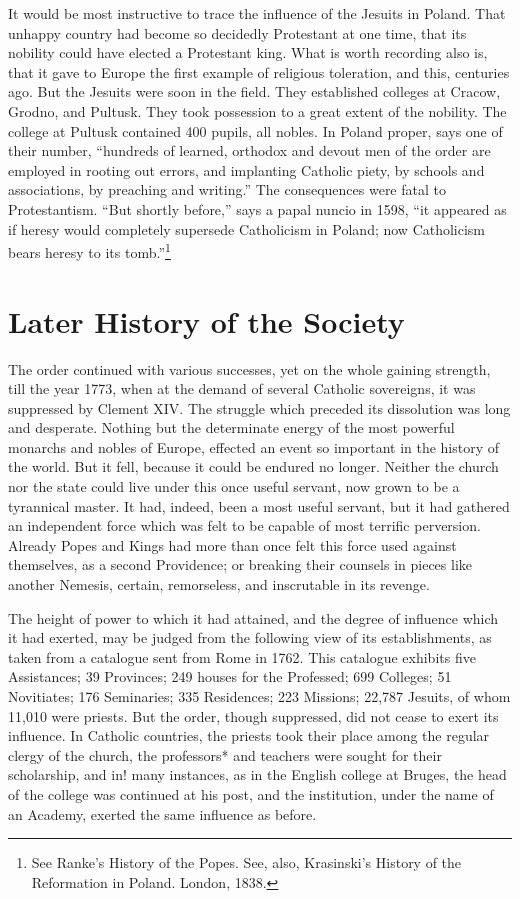 \documentclass[]{book}
\let\rmarkdownfootnote\footnote%
\def\footnote{\protect\rmarkdownfootnote}
\begin{document}
It would be most instructive to trace the influence of the Jesuits in Poland. That unhappy country had become so decidedly Protestant at one time, that its nobility could have elected a Protestant king. What is worth recording also is, that it gave to Europe the first example of religious toleration, and this, centuries ago. But the Jesuits were soon in the field. They established colleges at Cracow, Grodno, and Pultusk. They took possession to a great extent of the nobility. The college at Pultusk contained 400 pupils, all nobles. In Poland proper, says one of their number, ``hundreds of learned, orthodox and devout men of the order are employed in rooting out errors, and implanting Catholic piety, by schools and associations, by preaching and writing.'' The consequences were fatal to Protestantism. ``But shortly before,'' says a papal nuncio in 1598, ``it appeared as if heresy would completely supersede Catholicism in Poland; now Catholicism bears heresy to its tomb.''\footnote{See Ranke's History of the Popes. See, also, Krasinski's History of the Reformation in Poland. London, 1838.}

\hypertarget{later-history-of-the-society}{%
\chapter{Later History of the Society}\label{later-history-of-the-society}}

The order continued with various successes, yet on the whole gaining strength, till the year 1773, when at the demand of several Catholic sovereigns, it was suppressed by Clement XIV. The struggle which preceded its dissolution was long and desperate. Nothing but the determinate energy of the most powerful monarchs and nobles of Europe, effected an event so important in the history of the world. But it fell, because it could be endured no longer. Neither the church nor the state could live under this once useful servant, now grown to be a tyrannical master. It had, indeed, been a most useful servant, but it had gathered an independent force which was felt to be capable of most terrific perversion. Already Popes and Kings had more than once felt this force used against themselves, as a second Providence; or breaking their counsels in pieces like another Nemesis, certain, remorseless, and inscrutable in its revenge.

The height of power to which it had attained, and the degree of influence which it had exerted, may be judged from the following view of its establishments, as taken from a catalogue sent from Rome in 1762. This catalogue exhibits five Assistances; 39 Provinces; 249 houses for the Professed; 699 Colleges; 51 Novitiates; 176 Seminaries; 335 Residences; 223 Missions; 22,787 Jesuits, of whom 11,010 were priests. But the order, though suppressed, did not cease to exert its influence. In Catholic countries, the priests took their place among the regular clergy of the church, the professors* and teachers were sought for their scholarship, and in! many instances, as in the English college at Bruges, the head of the college was continued at his post, and the institution, under the name of an Academy, exerted the same influence as before.
\end{document}

